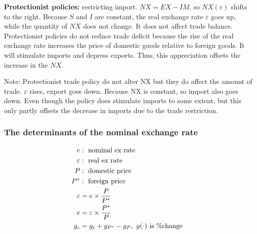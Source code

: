 \documentclass[12pt]{article}
\begin{document}
{\textbf {Protectionist policies:}}
restricting import. $ NX = EX - IM $, so $ NX(\varepsilon) $ shifts to the right.
Because $ S $ and $ I $ are constant, the real exchange rate $ \varepsilon $ goes up,
while the quantity of $ NX $ does not change. It does not affect trade balance.
Protectionist policies do not reduce trade deficit because the rise of the real
exchange rate increases the price of domestic goods relative to foreign goods.
It will stimulate imports and depress exports. Thus, this appreciation offsets the
increase in the $ NX $.

Note: Protectionist trade policy do not alter NX but they do affect the amount of
trade.
$ \varepsilon $ rises, export goes down. Because NX is constant, so import also goes
down.
Even though the policy does stimulate imports to some extent, but this only partly 
offsets the decrease in imports due to the trade restriction.


\begin{figure}[H]
\end{figure}





\subsubsection{The determinants of the nominal exchange rate}
\begin{align*}
e&: \text{ nominal ex rate }\\
\varepsilon&: \text{ real ex rate }\\
P&: \text{ domestic price }\\
P^{*}&: \text{ foreign price }\\
\varepsilon &= e  \times  \frac{P}{P^{*}}\\
e &= \varepsilon  \times  \frac{P^{*}}{P}\\
g_{e} &= g_{\varepsilon} + g_{P^{*}} - g_{P}, \text{ $ g(\cdot ) $ is \%change }
\end{align*}
\end{document}
